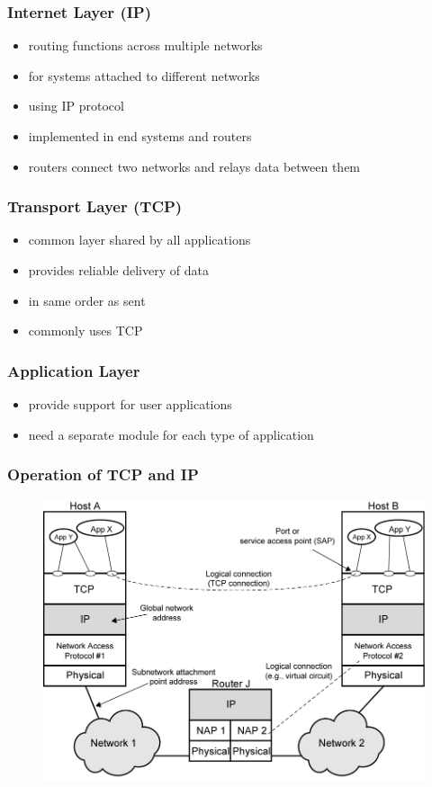 \documentclass[pdflatex,compress]{beamer}
\begin{document}
\begin{frame}
	\frametitle{Internet Layer (IP)}
	\begin{itemize}
		\item routing functions across multiple networks
		\item for systems attached to different networks
		\item using IP protocol
		\item implemented in end systems and routers
		\item routers connect two networks and relays data between them
	\end{itemize}
\end{frame}

\begin{frame}
	\frametitle{Transport Layer (TCP)}
	\begin{itemize}
		\item common layer shared by all applications
		\item provides reliable delivery of data
		\item in same order as sent
		\item commonly uses TCP
	\end{itemize}
\end{frame}

\begin{frame}
	\frametitle{Application Layer}
	\begin{itemize}
		\item provide support for user applications
		\item need a separate module for each type of application
	\end{itemize}
\end{frame}

\begin{frame}
	\frametitle{Operation of TCP and IP}
	\begin{figure}
		\centering
		\includegraphics[width=0.8\linewidth]{img/img02}
	\end{figure}
\end{frame}
\end{document}
